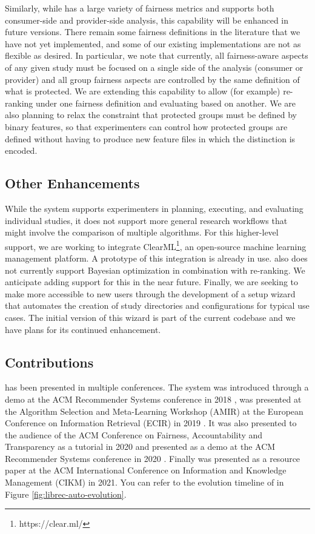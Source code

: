 Similarly, while \libauto{} has a large variety of fairness metrics and supports both consumer-side and provider-side analysis, this capability will be enhanced in future versions. There remain some fairness definitions in the literature that we have not yet implemented, and some of our existing implementations are not as flexible as desired. In particular, we note that currently, all fairness-aware aspects of any given study must be focused on a single side of the analysis (consumer or provider) and all group fairness aspects are controlled by the same definition of what is protected. We are extending this capability to allow (for example) re-ranking under one fairness definition and evaluating based on another. We are also planning to relax the constraint that protected groups must be defined by binary features, so that experimenters can control how protected groups are defined without having to produce new feature files in which the distinction is encoded. 


\subsection{Other Enhancements}

While the system supports experimenters in planning, executing, and evaluating individual studies, it does not support more general research workflows that might involve the comparison of multiple algorithms. For this higher-level support, we are working to integrate ClearML\footnote{https://clear.ml/}, an open-source machine learning management platform. A prototype of this integration is already in use. \libauto{} also does not currently support Bayesian optimization in combination with re-ranking. We anticipate adding support for this in the near future. Finally, we are seeking to make \libauto{} more accessible to new users through the development of a setup wizard that automates the creation of study directories and configurations for typical use cases. The initial version of this wizard is part of the current codebase and we have plans for its continued enhancement. 


\subsection{Contributions}

\libauto{} has been presented in multiple conferences. The system was introduced through a demo at the ACM Recommender Systems conference in 2018 \cite{mansoury2018automating}, was presented at the Algorithm Selection and Meta-Learning Workshop (AMIR) at the European Conference on Information Retrieval (ECIR) in 2019 \cite{mansoury2019algorithm}. It was also presented to the audience of the ACM Conference on Fairness, Accountability and Transparency as a tutorial in 2020 \cite{burke2020facct_libauto} and presented as a demo at the ACM Recommender Systems conference in 2020 \cite{Sonboli2020FARLA}. Finally \libauto{} was presented as a resource paper at the ACM International Conference on Information and Knowledge Management (CIKM) in 2021. You can refer to the evolution timeline of \libauto{} in Figure \ref{fig:librec-auto-evolution}.

